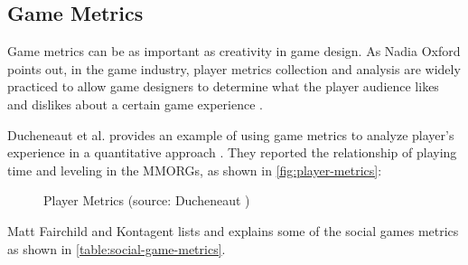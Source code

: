 \subsection{Game Metrics}

Game metrics can be as important as creativity in game design. As Nadia Oxford points out, in the game industry, player metrics collection and analysis are widely practiced to allow game designers to determine what the player audience likes and dislikes about a certain game experience \cite {Oxford2010}. 

Ducheneaut et al. provides an example of 
using game metrics to analyze player's experience in a quantitative approach \cite {ducheneaut2006alone}. They reported the relationship of playing time and leveling in the MMORGs, as shown in \autoref{fig:player-metrics}:

\begin{figure}[ht!]
	\centering
		\caption{Player Metrics (source: Ducheneaut \cite{ducheneaut2006alone})}
		\label{fig:player-metrics}
\end{figure}

Matt Fairchild \cite {Fairchild2010} and Kontagent \cite {Kontagent2010} lists and explains some of the social games metrics as shown in \autoref{table:social-game-metrics}.

